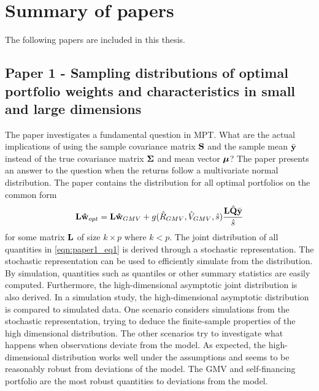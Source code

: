 \documentclass[12pt, oneside]{book}\usepackage{knitr}
\begin{document}
{%
\chapter{Summary of papers}\label{ch:papersummary}


The following papers are included in this thesis.
\section{Paper 1 - Sampling distributions of optimal portfolio weights and characteristics in small and large dimensions}\label{sec:paper1}
The paper investigates a fundamental question in MPT. 
What are the actual implications of using the sample covariance matrix $\mathbf{S}$ and the sample mean $\bar{\mathbf{y}}$ instead of the true covariance matrix $\mathbf{\Sigma}$ and mean vector $\mbox{\boldmath$\mu$}$?
The paper presents an answer to the question when the returns follow a multivariate normal distribution. 
The paper contains the distribution for all optimal portfolios on the common form
\begin{equation}\label{eqn:paper1_eq1}
  \mathbf{L}\mathbf{\hat{w}}_{opt} = \mathbf{L}\mathbf{\hat{w}}_{GMV} + g(\hat{R}_{GMV}, \hat{V}_{GMV}, \hat{s})\frac{\mathbf{L}\hat{\mathbf{Q}}\bar{\mathbf{y}}}{\hat{s}}
\end{equation}
for some matrix $\mathbf{L}$ of size $k \times p$ where $k<p$.
The joint distribution of all quantities in \eqref{eqn:paper1_eq1} is derived through a stochastic representation. 
The stochastic representation can be used to efficiently simulate from the distribution.
By simulation, quantities such as quantiles or other summary statistics are easily computed.
Furthermore, the high-dimensional asymptotic joint distribution is also derived. 
In a simulation study, the high-dimensional asymptotic distribution is compared to simulated data.
One scenario considers simulations from the stochastic representation, trying to deduce the finite-sample properties of the high dimensional distribution.
The other scenarios try to investigate what happens when observations deviate from the model.
As expected, the high-dimensional distribution works well under the assumptions and seems to be reasonably robust from deviations of the model.
The GMV and self-financing portfolio are the most robust quantities to deviations from the model.

}
\end{document}
